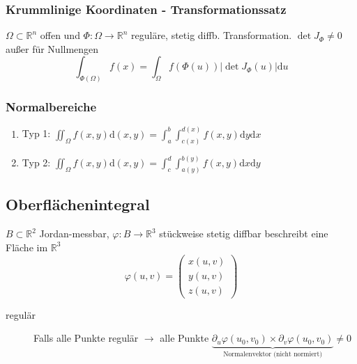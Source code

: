 \begin{sectionbox}
    \subsubsection{Krummlinige Koordinaten - Transformationssatz}
    $\Omega \subset \mathbb R^n$ offen und $\Phi : \Omega \rightarrow \mathbb R^n$ reguläre, stetig diffb. Transformation. $\det J_\Phi\ne 0$ außer für Nullmengen
    \begin{equation*}
        \int_{\Phi(\Omega)} f(x)=\int_\Omega f(\Phi(u))|\det{J_\Phi(u)}|\mathrm du
    \end{equation*}
\end{sectionbox}

\begin{sectionbox}
    \subsubsection{Normalbereiche}
    \begin{enumerate}
        \item Typ 1: $\iint_\Omega f(x,y)\mathrm d(x,y)=\int_a^b\int_{c(x)}^{d(x)}f(x,y)\mathrm dy \mathrm dx$
        \item Typ 2: $\iint_\Omega f(x,y)\mathrm d(x,y)=\int_c^d\int_{a(y)}^{b(y)}f(x,y)\mathrm dx \mathrm dy$
    \end{enumerate}
\end{sectionbox}

\subsection{Oberflächenintegral}
\begin{sectionbox}
    $B \subset \mathbb R^2$ Jordan-messbar, $\varphi: B \rightarrow \mathbb R^3$ stückweise stetig diffbar beschreibt eine Fläche im $\mathbb R^3$
    \begin{equation*}
        \varphi(u,v)=\begin{pmatrix}
            x(u,v) \\ y(u,v) \\ z(u,v)
        \end{pmatrix}
    \end{equation*}

    \begin{description}
        \item[regulär] Falls alle Punkte regulär $\rightarrow$ alle Punkte $\underbrace{\partial_u\varphi(u_0,v_0) \times \partial_v\varphi(u_0,v_0)}_{\text{Normalenvektor (nicht normiert)}} \ne 0$
    \end{description}
\end{sectionbox}

